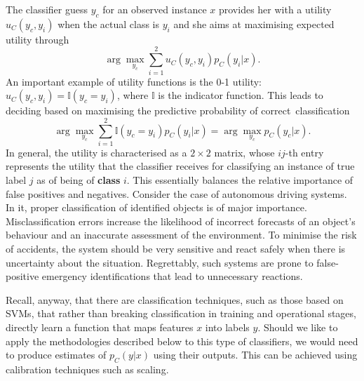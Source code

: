  The classifier guess $y_c$ for an observed instance $x$ provides her with a utility $u_C (y_c, y_i)$ when the
 actual class is $y_i$ and she aims at maximising expected utility
 through  
\begin{equation}\label{amarinha}
 \arg\max_{y_c} \sum_{i=1}^2
u_C (y_c , y_i ) p _C (y_i | x ).
\end{equation}
An important example of utility functions is the 0-1 utility: $u_C (y_c, y_i) = \mathbb{I}(y_c = y_i)$, where $\mathbb{I}$ is the indicator function. This leads to deciding based on maximising the
 predictive probability of correct~classification
\begin{equation}\label{seen}
\arg\max_{y_c} \sum_{i=1}^2 \mathbb{I}(y_c = y_i) p_C(y_i|x) = \arg\max_{y_c} p_C(y_c|x).
\end{equation}
%
In general, the 
utility is characterised as
a $2 \times 2$ matrix, whose $ij$-th entry 
represents the utility that the classifier
receives for classifying an instance of true label $j$ as of being of {\bf class} $i$. This essentially balances the relative importance of false positives and negatives. Consider the case of autonomous driving systems. 
In it, proper classification of identified objects is of
major 
importance. Misclassification errors increase the 
likelihood of incorrect forecasts of an object’s behaviour and an inaccurate assessment of the environment. To minimise the risk of accidents, the system should be very sensitive and react safely when there is uncertainty about the situation. Regrettably, such systems are prone to false-positive emergency identifications that lead to unnecessary reactions. %



Recall, anyway, that there are classification techniques, such as those based on SVMs, that rather than breaking classification in training and operational stages, directly learn a function that maps features $x$ into labels $y$. Should we like to apply the methodologies described below to this type of classifiers, we would need to produce estimates of $p_C(y|x)$ using their outputs. This can be achieved using calibration techniques such as 
\cite{platt1999probabilistic} scaling.

